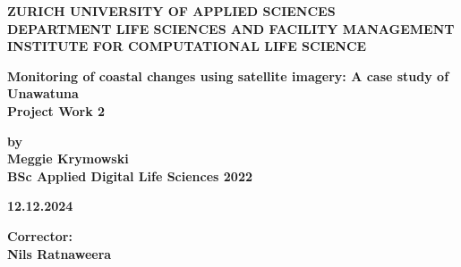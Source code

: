 \begin{titlepage}
    \begin{center}
        \singlespacing
 
        \vspace*{2cm}
 
        \textbf{\large ZURICH UNIVERSITY OF APPLIED SCIENCES} \\
        \textbf{\large DEPARTMENT LIFE SCIENCES AND FACILITY MANAGEMENT} \\
        \textbf{\large INSTITUTE FOR COMPUTATIONAL LIFE SCIENCE} \\
 
        \vspace{4cm}
 
        \textbf{\Large Monitoring of coastal changes using satellite imagery: A case study of Unawatuna} \\
        \vspace{0.5cm}
        \textbf{\Large Project Work 2} \\
 
        \vspace{5cm}
 
        \textbf{\large by} \\
        \textbf{\large Meggie Krymowski} \\
        \textbf{\large BSc Applied Digital Life Sciences 2022} \\
 
        \vspace{1cm}
 
        \textbf{\large 12.12.2024} \\
        \end{center}
        \vfill
        \begin{flushleft}
        \textbf{\large Corrector:} \\
        \textbf{\large Nils Ratnaweera} \\
        \end{flushleft}
\end{titlepage}